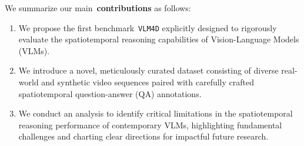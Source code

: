 We summarize our main~\textbf{contributions} as follows:
\begin{enumerate}
\item We propose the first benchmark~\texttt{VLM4D} explicitly designed to rigorously evaluate the spatiotemporal reasoning capabilities of Vision-Language Models (VLMs).
\item We introduce a novel, meticulously curated dataset consisting of diverse real-world and synthetic video sequences paired with carefully crafted spatiotemporal question-answer (QA) annotations.
\item We conduct an analysis to identify critical limitations in the spatiotemporal reasoning performance of contemporary VLMs, highlighting fundamental challenges and charting clear directions for impactful future research.
\end{enumerate}





